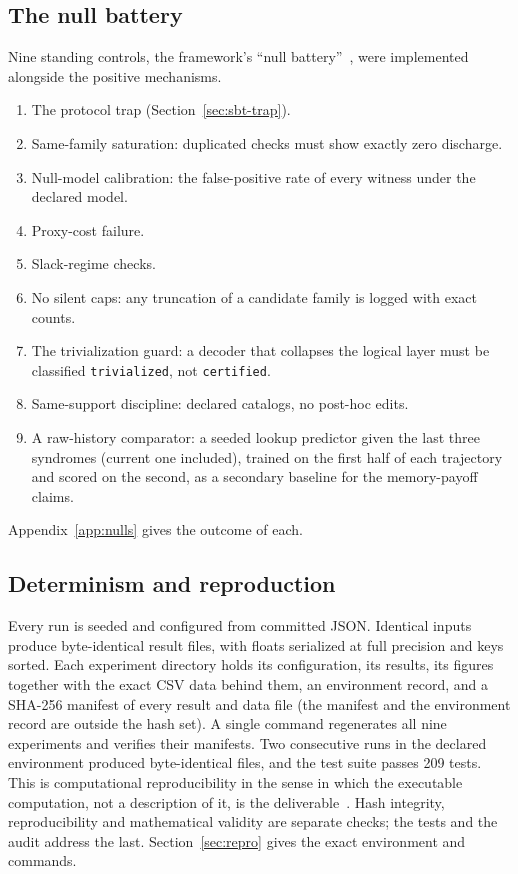 \subsection{The null battery}
\label{sec:methods-nulls}

Nine standing controls, the framework's ``null battery''~\cite{sbt-ng}, were implemented alongside the positive mechanisms. %
\begin{enumerate}[nosep]
\item The protocol trap (Section~\ref{sec:sbt-trap}).
\item Same-family saturation: duplicated checks must show exactly zero discharge.
\item Null-model calibration: the false-positive rate of every witness under the declared model.
\item Proxy-cost failure.
\item Slack-regime checks.
\item No silent caps: any truncation of a candidate family is logged with exact counts.
\item The trivialization guard: a decoder that collapses the logical layer must be classified \texttt{trivialized}, not \texttt{certified}.
\item Same-support discipline: declared catalogs, no post-hoc edits.
\item A raw-history comparator: a seeded lookup predictor given the last three syndromes (current one included), trained on the first half of each trajectory and scored on the second, as a secondary baseline for the memory-payoff claims.
\end{enumerate}
Appendix~\ref{app:nulls} gives the outcome of each.

\subsection{Determinism and reproduction}
\label{sec:methods-repro}

Every run is seeded and configured from committed JSON. Identical inputs produce byte-identical result files, with floats serialized at full precision and keys sorted. Each experiment directory holds its configuration, its results, its figures together with the exact CSV data behind them, an environment record, and a SHA-256 manifest of every result and data file (the manifest and the environment record are outside the hash set). A single command regenerates all nine experiments and verifies their manifests. Two consecutive runs in the declared environment produced byte-identical files, and the test suite passes 209 tests. %
This is computational reproducibility in the sense in which the executable computation, not a description of it, is the deliverable~\cite{schwab2000redoc,peng2011reproducible}. Hash integrity, reproducibility and mathematical validity are separate checks; the tests and the audit address the last. Section~\ref{sec:repro} gives the exact environment and commands.

